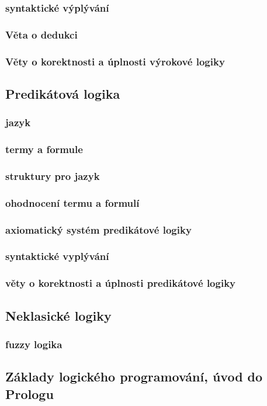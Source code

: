 \documentclass[10pt,a4paper]{article}
\begin{document}
		\subsubsection{syntaktické výplývání}

		\subsubsection{Věta o dedukci}

		\subsubsection{Věty o korektnosti a úplnosti výrokové logiky}

	\subsection{Predikátová logika}

		\subsubsection{jazyk}

		\subsubsection{termy a formule}

		\subsubsection{struktury pro jazyk}

		\subsubsection{ohodnocení termu a formulí}

		\subsubsection{axiomatický systém predikátové logiky}

		\subsubsection{syntaktické vyplývání}

		\subsubsection{věty o korektnosti a úplnosti predikátové logiky}

	\subsection{Neklasické logiky}

		\subsubsection{fuzzy logika}

	\subsection{Základy logického programování, úvod do Prologu}
	
			
\end{document}
